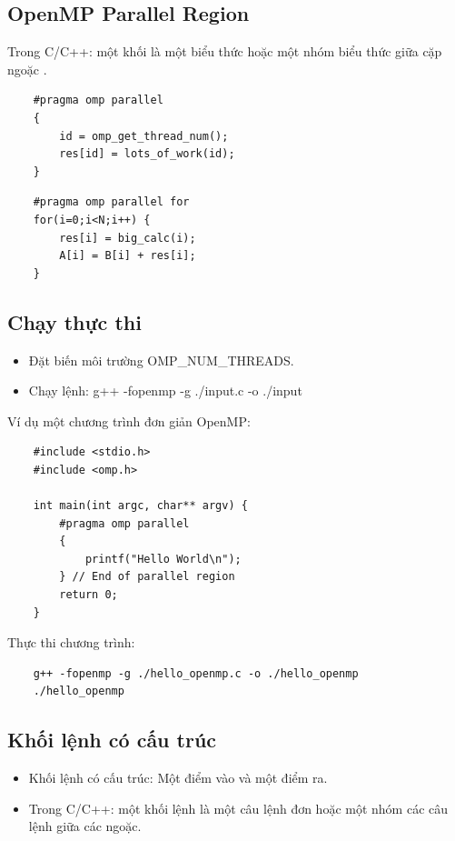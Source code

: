 \documentclass[14pt, a4paper]{article}
\numberwithin{equation}{section}
\numberwithin{figure}{section}
\numberwithin{dl}{section}
\numberwithin{md}{section}
\numberwithin{bd}{section}
\numberwithin{dn}{section}
\numberwithin{hq}{section}
\begin{document}
\subsection{OpenMP Parallel Region}

Trong C/C++: một khối là một biểu thức hoặc một nhóm biểu thức giữa cặp ngoặc { }.

\begin{verbatim}
    #pragma omp parallel
    {
        id = omp_get_thread_num();
        res[id] = lots_of_work(id);
    }
\end{verbatim}

\begin{verbatim}
    #pragma omp parallel for
    for(i=0;i<N;i++) {
        res[i] = big_calc(i);
        A[i] = B[i] + res[i];
    } 
\end{verbatim}

\subsection{Chạy thực thi}


\begin{itemize}
    \item Đặt biến môi trường OMP\_NUM\_THREADS.
    \item Chạy lệnh: g++ -fopenmp -g ./input.c -o ./input
\end{itemize}

Ví dụ một chương trình đơn giản OpenMP:

\begin{verbatim}
    #include <stdio.h>
    #include <omp.h>

    int main(int argc, char** argv) {
        #pragma omp parallel
        {
            printf("Hello World\n");
        } // End of parallel region 
        return 0;
    }
\end{verbatim}
Thực thi chương trình:
\begin{verbatim}
    g++ -fopenmp -g ./hello_openmp.c -o ./hello_openmp
    ./hello_openmp
\end{verbatim}

\subsection{Khối lệnh có cấu trúc}

\begin{itemize}
    \item Khối lệnh có cấu trúc: Một điểm vào và một điểm ra.
    \item Trong C/C++: một khối lệnh là một câu lệnh đơn hoặc một nhóm các câu lệnh giữa các ngoặc.
\end{itemize}
\end{document}
